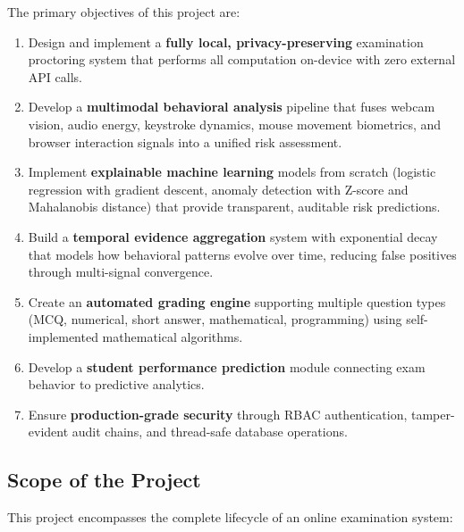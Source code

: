 \documentclass{article}
\begin{document}
The primary objectives of this project are:

\begin{enumerate}[label=\textbf{O\arabic*.}]
    \item Design and implement a \textbf{fully local, privacy-preserving} examination proctoring system that performs all computation on-device with zero external API calls.

    \item Develop a \textbf{multimodal behavioral analysis} pipeline that fuses webcam vision, audio energy, keystroke dynamics, mouse movement biometrics, and browser interaction signals into a unified risk assessment.

    \item Implement \textbf{explainable machine learning} models from scratch (logistic regression with gradient descent, anomaly detection with Z-score and Mahalanobis distance) that provide transparent, auditable risk predictions.

    \item Build a \textbf{temporal evidence aggregation} system with exponential decay that models how behavioral patterns evolve over time, reducing false positives through multi-signal convergence.

    \item Create an \textbf{automated grading engine} supporting multiple question types (MCQ, numerical, short answer, mathematical, programming) using self-implemented mathematical algorithms.

    \item Develop a \textbf{student performance prediction} module connecting exam behavior to predictive analytics.

    \item Ensure \textbf{production-grade security} through RBAC authentication, tamper-evident audit chains, and thread-safe database operations.
\end{enumerate}

\subsection{Scope of the Project}

This project encompasses the complete lifecycle of an online examination system:
\end{document}
